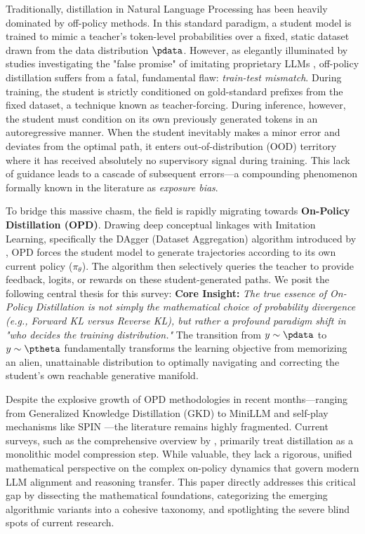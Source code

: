 Traditionally, distillation in Natural Language Processing has been heavily dominated by off-policy methods. In this standard paradigm, a student model is trained to mimic a teacher's token-level probabilities over a fixed, static dataset drawn from the data distribution $\pdata$. However, as elegantly illuminated by studies investigating the "false promise" of imitating proprietary LLMs \citep{2305.15717}, off-policy distillation suffers from a fatal, fundamental flaw: \textit{train-test mismatch}. During training, the student is strictly conditioned on gold-standard prefixes from the fixed dataset, a technique known as teacher-forcing. During inference, however, the student must condition on its own previously generated tokens in an autoregressive manner. When the student inevitably makes a minor error and deviates from the optimal path, it enters out-of-distribution (OOD) territory where it has received absolutely no supervisory signal during training. This lack of guidance leads to a cascade of subsequent errors—a compounding phenomenon formally known in the literature as \textit{exposure bias}. 

To bridge this massive chasm, the field is rapidly migrating towards \textbf{On-Policy Distillation (OPD)}. Drawing deep conceptual linkages with Imitation Learning, specifically the DAgger (Dataset Aggregation) algorithm introduced by \citet{ross2011reduction}, OPD forces the student model to generate trajectories according to its own current policy ($\pi_\theta$). The algorithm then selectively queries the teacher to provide feedback, logits, or rewards on these student-generated paths. We posit the following central thesis for this survey:
\textbf{Core Insight:} \textit{The true essence of On-Policy Distillation is not simply the mathematical choice of probability divergence (e.g., Forward KL versus Reverse KL), but rather a profound paradigm shift in "who decides the training distribution."} The transition from $y \sim \pdata$ to $y \sim \ptheta$ fundamentally transforms the learning objective from memorizing an alien, unattainable distribution to optimally navigating and correcting the student's own reachable generative manifold.

Despite the explosive growth of OPD methodologies in recent months—ranging from Generalized Knowledge Distillation (GKD) \citep{2306.13649} to MiniLLM \citep{2306.08543} and self-play mechanisms like SPIN \citep{2401.01335}—the literature remains highly fragmented. Current surveys, such as the comprehensive overview by \citet{2402.13116}, primarily treat distillation as a monolithic model compression step. While valuable, they lack a rigorous, unified mathematical perspective on the complex on-policy dynamics that govern modern LLM alignment and reasoning transfer. This paper directly addresses this critical gap by dissecting the mathematical foundations, categorizing the emerging algorithmic variants into a cohesive taxonomy, and spotlighting the severe blind spots of current research.

